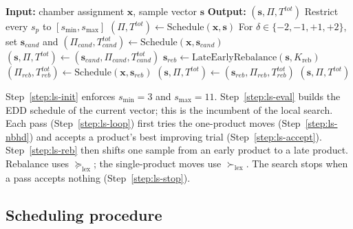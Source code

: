 \documentclass[11pt]{article}
\begin{document}
\begin{algorithm}[H]
\caption{SampleSizeLocalSearch}
\label{alg:sample_ls}
\begin{algorithmic}[1]
\State \textbf{Input:} chamber assignment \(\mathbf{x}\), sample vector \(\mathbf{s}\)
\State \textbf{Output:} \((\mathbf{s},\Pi,T^{tot})\)
\State Restrict every \(s_p\) to \([s_{\min},s_{\max}]\) \label{step:ls-init}
\State \((\Pi,T^{tot})\leftarrow\text{Schedule}(\mathbf{x},\mathbf{s})\) \label{step:ls-eval}
\Repeat \label{step:ls-loop}
        \State For \(\delta\in\{-2,-1,+1,+2\}\), set \(\mathbf{s}_{cand}\) and \((\Pi_{cand},T^{tot}_{cand})\leftarrow\mathrm{Schedule}(\mathbf{x},\mathbf{s}_{cand})\) \label{step:ls-nbhd}
         \label{step:ls-accept}
            \State \((\mathbf{s},\Pi,T^{tot})\leftarrow(\mathbf{s}_{cand},\Pi_{cand},T^{tot}_{cand})\)
        \EndIf
    \EndFor
    \State \(\mathbf{s}_{reb}\leftarrow\text{LateEarlyRebalance}(\mathbf{s},K_{\mathrm{reb}})\) \label{step:ls-reb}
    \State \((\Pi_{reb},T^{tot}_{reb})\leftarrow\mathrm{Schedule}(\mathbf{x},\mathbf{s}_{reb})\)
        \State \((\mathbf{s},\Pi,T^{tot})\leftarrow(\mathbf{s}_{reb},\Pi_{reb},T^{tot}_{reb})\)
    \EndIf
{} \label{step:ls-stop}
\State \Return \((\mathbf{s},\Pi,T^{tot})\)
\end{algorithmic}
\end{algorithm}

Step~\ref{step:ls-init} enforces \(s_{\min}=3\) and \(s_{\max}=11\).
Step~\ref{step:ls-eval} builds the EDD schedule of the current
vector; this is the incumbent of the local search.
Each pass (Step~\ref{step:ls-loop}) first tries the one-product
moves (Step~\ref{step:ls-nbhd}) and accepts a product's best
improving trial (Step~\ref{step:ls-accept}).
Step~\ref{step:ls-reb} then shifts one sample from an early product
to a late product.
Rebalance uses \(\succeq_{\mathrm{lex}}\); the single-product moves use
\(\succ_{\mathrm{lex}}\).
The search stops when a pass accepts nothing
(Step~\ref{step:ls-stop}).

\subsection{Scheduling procedure}
\label{subsec:scheduling_procedure}
\label{subsec:scheduling}
\end{document}

